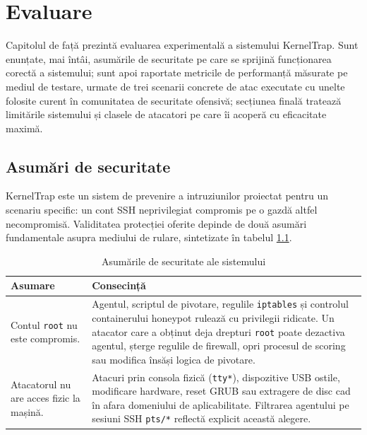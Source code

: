 
\chapter{Evaluare}

Capitolul de față prezintă evaluarea experimentală a sistemului KernelTrap.
Sunt enunțate, mai întâi, asumările de securitate pe care se sprijină
funcționarea corectă a sistemului; sunt apoi raportate metricile de
performanță măsurate pe mediul de testare, urmate de trei scenarii concrete
de atac executate cu unelte folosite curent în comunitatea de securitate
ofensivă; secțiunea finală tratează limitările sistemului și clasele de
atacatori pe care îi acoperă cu eficacitate maximă.

\section{Asumări de securitate}

KernelTrap este un sistem de prevenire a intruziunilor proiectat pentru un
scenariu specific: un cont SSH neprivilegiat compromis pe o gazdă altfel
necompromisă. Validitatea protecției oferite depinde de două asumări fundamentale
asupra mediului de rulare, sintetizate în tabelul \ref{tab:cap6-trust}.

\begin{table}[h]
  \centering
  \caption{Asumările de securitate ale sistemului}
  \label{tab:cap6-trust}
  \renewcommand{\arraystretch}{1.08}
  \begin{tabular}{|p{}|p{}|}
    \hline
    \textbf{Asumare} & \textbf{Consecință} \\
    \hline\hline
    Contul \texttt{root} nu este compromis.
      & Agentul, scriptul de pivotare, regulile \texttt{iptables} și controlul containerului honeypot rulează cu privilegii ridicate. Un atacator care a obținut deja drepturi \texttt{root} poate dezactiva agentul, șterge regulile de firewall, opri procesul de scoring sau modifica însăși logica de pivotare. \\
    \hline
    Atacatorul nu are acces fizic la mașină.
      & Atacuri prin consola fizică (\texttt{tty*}), dispozitive USB ostile, modificare hardware, reset GRUB sau extragere de disc cad în afara domeniului de aplicabilitate. Filtrarea agentului pe sesiuni SSH \texttt{pts/*} reflectă explicit această alegere. \\
    \hline
  \end{tabular}
\end{table}

